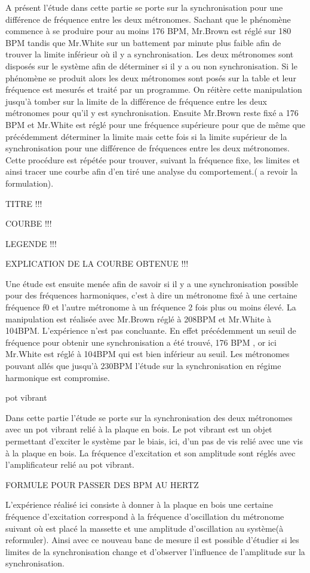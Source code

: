 	A présent l'étude dans cette partie se porte sur la synchronisation pour une différence de fréquence entre les deux métronomes. Sachant que le phénomène commence à se produire pour au moins 176 BPM, Mr.Brown est réglé sur 180 BPM tandis que Mr.White sur un battement par minute plus faible afin de trouver la limite inférieur où il y a synchronisation. Les deux métronomes sont disposés sur le système afin de déterminer si il y a ou non synchronisation. Si le phénomène se produit alors les deux métronomes sont posés sur la table et leur fréquence est mesurés et traité par un programme. On réitère cette manipulation jusqu'à tomber sur la limite de la différence de fréquence entre les deux métronomes pour qu'il y est synchronisation.   Ensuite Mr.Brown reste fixé a 176 BPM et Mr.White est réglé pour une fréquence supérieure pour que de même que précédemment déterminer la limite mais cette fois si la limite supérieur de la synchronisation pour une différence de fréquences entre les deux métronomes. Cette procédure est répétée pour trouver, suivant la fréquence fixe, les limites et ainsi tracer une courbe afin d'en tiré une analyse du comportement.( a revoir la formulation). 
	
					TITRE !!!
					
					COURBE !!!
					
					LEGENDE !!!
					
					EXPLICATION DE LA COURBE OBTENUE !!!
					
Une étude est ensuite menée afin de savoir si il y a une synchronisation possible pour des fréquences harmoniques, c'est à dire un métronome fixé à une certaine fréquence f0 et l'autre métronome à un fréquence 2 fois plus ou moins élevé. La manipulation est réalisée avec Mr.Brown réglé à 208BPM et Mr.White à 104BPM. L'expérience n'est pas concluante. En effet précédemment un seuil de fréquence pour obtenir une synchronisation a été trouvé, 176 BPM , or ici Mr.White est réglé à 104BPM qui est bien inférieur au seuil. Les métronomes pouvant allés que jusqu'à 230BPM l'étude sur la synchronisation en régime harmonique est compromise. 




pot vibrant

Dans cette partie l'étude se porte sur la synchronisation des deux métronomes avec un pot vibrant relié à la plaque en bois. Le pot vibrant est un objet permettant d'exciter le système par le biais, ici, d'un pas de vis relié avec une vis à la plaque en bois. La fréquence d'excitation et son amplitude sont réglés avec l'amplificateur relié au pot vibrant.

												FORMULE POUR PASSER DES BPM AU HERTZ

 L'expérience réalisé ici consiste à donner à la plaque en bois une certaine fréquence d'excitation correspond à la fréquence d'oscillation du métronome suivant où est placé la massette et une amplitude d'oscillation au système(à reformuler).
Ainsi avec ce nouveau banc de mesure il est possible d'étudier si les limites de la synchronisation change et d'observer l'influence de l'amplitude sur la synchronisation.
 
